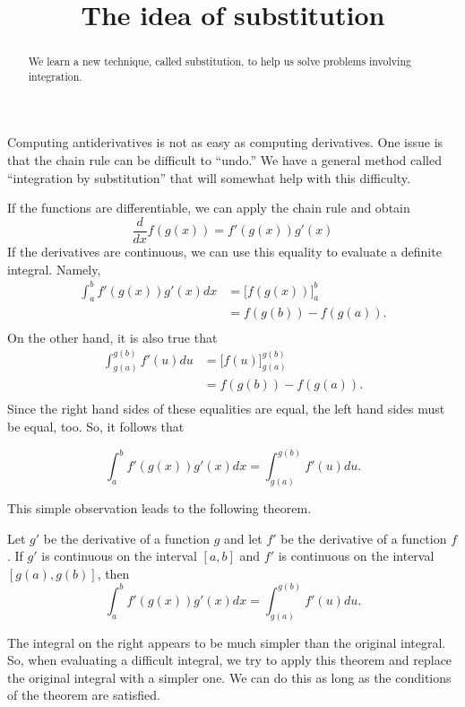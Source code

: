 \documentclass{ximera}
\title[Dig-In:]{The idea of substitution}
\begin{document}
\begin{abstract}
  We learn a new technique, called substitution, to help us solve
  problems involving integration.
\end{abstract}
\maketitle


Computing antiderivatives is not as easy as computing derivatives.
One issue is that the chain rule can be difficult to ``undo.''  We
have a general method called ``integration by substitution'' that will
somewhat help with this difficulty. 

If the functions are differentiable, we can apply the chain rule and obtain
\[
\frac{d}{dx} f(g(x)) = f'(g(x))g'(x)
\]
If the derivatives are continuous, we can use this equality to evaluate a definite integral. Namely,
\begin{align*}
  \int_a^b f'(g(x))g'(x) dx &= \bigg[ f(g(x)) \bigg]_a^b \\
  &= f(g(b)) - f(g(a)). \\
 \end{align*}
On the other hand, it is also true that
\begin{align*}
  \int_{g(a)}^{g(b)} f'(u) du &= \bigg[ f(u) \bigg]_{g(a)}^{g(b)}\\
  &= f(g(b)) - f(g(a)). \\
 \end{align*}
 Since the right hand sides of these equalities are equal,  the left hand sides must be equal, too. So, it follows that
 
\[
  \int_a^b f'(g(x))g'(x) dx =  \int_{g(a)}^{g(b)} f'(u) du .
\]

 
This simple observation  leads to the following theorem. 


\begin{theorem} 
Let $g'$ be the derivative of a  function $g$ and let $f'$ be the derivative of a function $f$. If $g'$ is continuous on the interval $[a,b]$ and  $f'$ is
continuous on the interval $[g(a),g(b)]$, then
\[
\int_a^b f'(g(x)) g'(x) dx =\int_{g(a)}^{g(b)} f'(u) du.
\]
\end{theorem}
The integral on the right appears to be much simpler than the original integral.
So, when evaluating a difficult integral,  we try to apply this theorem and replace the original integral with a simpler one.
 We can do this as long as the conditions of the theorem are satisfied.
\end{document}
